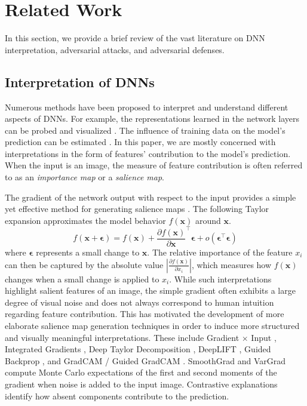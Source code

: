 \section{Related Work} \label{sec:related_work}
In this section, we provide a brief review of the vast literature on DNN interpretation, adversarial attacks, and adversarial defenses. 

\subsection{Interpretation of DNNs} \label{subsec:interpreting_dnn}
Numerous methods have been proposed to interpret and understand different aspects of DNNs. For example, the representations learned in the network layers can be probed and visualized \cite{Zeiler2014,BoleiZhou2015,NetDissection2017,fong2018}. The influence of training data on the model's prediction can be estimated \cite{Koh2017:influence-functions}. In this paper, we are mostly concerned with interpretations in the form of features' contribution to the model's prediction. When the input is an image, the measure of feature contribution is often referred to as an \emph{importance map} or a \emph{salience map}. 

The gradient of the network output with respect to the input provides a simple yet effective method for generating salience maps \cite{simple_gradient}.  The following Taylor expansion approximates the model behavior $f(\bm{x})$ around $\bm{x}$.  \begin{equation}
f(\bm x + \bm \epsilon) = f(\bm x) + \frac{\partial f(\bm{x})}{\partial \bm{x}}^\top \bm \epsilon + o(\bm \epsilon ^\top \bm \epsilon)
\end{equation}
where $\bm \epsilon$ represents a small change to $\bm x$. 
The relative importance of the feature $x_i$ can then be captured by the absolute value $|\frac{\partial f(\bm{x})}{\partial x_i} |$, which measures how $f(\bm{x})$ changes when a small change is applied to $x_i$. While such interpretations highlight salient features of an image, the simple gradient often exhibits a large degree of visual noise and does not always correspond to human intuition regarding feature contribution. %
This has motivated the development of more elaborate salience map generation techniques in order to induce more structured and visually meaningful interpretations. These include Gradient $\times$ Input \cite{deeplift}, Integrated Gradients \cite{integrated_gradients}, Deep Taylor Decomposition \cite{deep_taylor}, DeepLIFT \cite{deeplift}, Guided Backprop \cite{guided_backprop}, and GradCAM / Guided GradCAM \cite{selvaraju2016gradcam}. SmoothGrad \cite{smoothgrad} and VarGrad \cite{sanity_checks_salience_maps} compute Monte Carlo expectations of the first and second moments of the gradient when noise is added to the input image. Contrastive explanations \cite{dhur2018explanations} identify how absent components contribute to the prediction.

